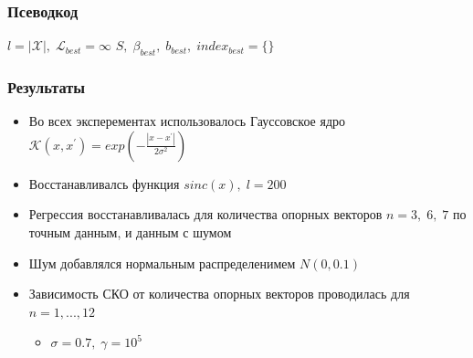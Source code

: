 \documentclass{beamer}
\begin{document}
\begin{frame}
	\frametitle{Псеводкод}
	\begin{algorithm}[H]

		$l = |\mathcal{X}|, \; \mathcal{L}_{best} = \infty$\;
		$S, \; \beta_{best},\; b_{best},\; index_{best} = \{\}$\;

	\end{algorithm}

\end{frame}
\begin{frame}
	\frametitle{Результаты}
	\begin{itemize}
		\item Во всех эксперементах использовалось Гауссовское ядро
		      $\mathcal{K}(x, x^\prime) = exp(- \frac{|x - x^\prime|}{2 \sigma^2})$
		\item Восстанавливалсь функция $sinc(x),\; l = 200$
		\item Регрессия восстанавливалась для количества опорных векторов $n = 3,\;
			      6,\; 7$ по точным данным, и данным с шумом
		\item Шум добавлялся нормальным распределенимем $N(0, 0.1)$
		\item Зависимость СКО от количества опорных векторов проводилась для $n = 1,
			      ..., 12$
		      \begin{itemize}
			      \item $\sigma = 0.7, \; \gamma = 10^5$
		      \end{itemize}


	\end{itemize}
\end{frame}
\end{document}
